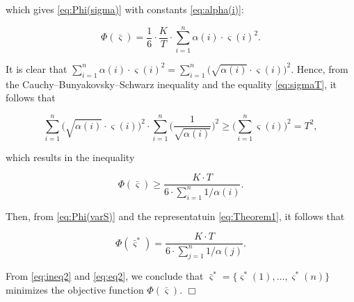 which gives \eqref{eq:Phi(sigma)} with constants \eqref{eq:alpha(i)}:

\begin{equation}\label{eq:Phi(varS)}

\Phi(\bar{\varsigma}) = {\frac{1}{6}}\cdot{\frac{K}{T}}\cdot \sum_{i=1}^{n} \alpha(i) \cdot {\varsigma (i)}^2.

\end{equation}

It is clear that $\sum_{i=1}^{n} \alpha(i) \cdot {\varsigma (i)}^2 = \sum_{i=1}^{n} \Big( \sqrt{\alpha(i)} \cdot \varsigma (i)\Big)^2$. Hence, from the Cauchy--Bunyakovsky--Schwarz inequality and the equality \eqref{eq:sigmaT}, it follows that

\begin{equation}\label{eq:ineq1}

\sum_{i=1}^{n} \Big( \sqrt{\alpha(i)} \cdot \varsigma (i)\Big)^2 \cdot \sum_{i=1}^{n} \Big(\frac{1}{\sqrt{\alpha(i)}}\Big)^2 \geq \Big(\sum_{i=1}^{n} \varsigma (i)\Big)^2 = T^2,

\end{equation}

which results in the inequality

\begin{equation}\label{eq:ineq2}

\Phi(\bar{\varsigma}) \geq \frac{K \cdot T}{6 \cdot \sum_{i=1}^{n} 1 / \alpha(i)}.

\end{equation}

Then, from \eqref{eq:Phi(varS)} and the representatuin \eqref{eq:Theorem1}, it follows that

\begin{equation}\label{eq:eq2}

\Phi(\bar{\varsigma}^*) = \frac{K \cdot T}{6 \cdot \sum_{j=1}^{n} 1 / \alpha(j)}.

\end{equation}

From \eqref{eq:ineq2} and \eqref{eq:eq2}, we conclude that  $\bar{\varsigma}^* = \{{\varsigma^*}(1), \dotsc , {\varsigma^*}(n)\}$ minimizes the objective function $\Phi(\bar{\varsigma})$. \hfill $\Box$



\smallskip








